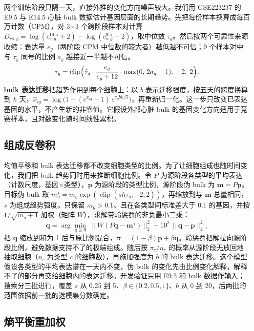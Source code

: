 \documentclass[UTF8,zihao=-4,fontset=none,a4paper]{ctexart}
\begin{document}
两个训练阶段只隔一天，直接外推的变化方向噪声较大。我们用 GSE223237 的 E9.5 与 E14.5 心脏 bulk 数据估计基因层面的长期趋势。先把每份样本换算成每百万计数（CPM），对 3$\times$3 个跨阶段样本对计算 $D_{rs,g}=\log(c^{14.5}_{r,g}+2)-\log(c^{9.5}_{s,g}+2)$，取中位数 $\tilde\tau_g$。然后按两个可靠性来源收缩：表达量 $e_g$（两阶段 CPM 中位数的较大者）越低越不可信；9 个样本对中与 $\tilde\tau_g$ 同号的比例 $a_g$ 越接近一半越不可信。
\begin{equation}
\tau_g=\operatorname{clip}\Bigl(\tilde\tau_g\cdot\frac{e_g}{e_g+12}\cdot\max(0,\,2a_g-1),\;-2,\;2\Bigr).
\end{equation}
\textbf{bulk 表达迁移}把趋势作用到每个细胞上：以 $b$ 表示迁移强度，按五天的跨度换算到 $h$ 天，$\hat x_{ig}=\log\bigl(1+(e^{x_{ig}}-1)\,e^{\tau_g bh/5}\bigr)$，再重新归一化。这一步只改变已表达基因的水平，不产生新的非零值。它假设外部心脏 bulk 的基因变化方向适用于竞赛样本，且对数变化随时间线性累积。

\subsection{组成反卷积}

均值平移和 bulk 表达迁移都不改变细胞类型的比例。为了让细胞组成也随时间变化，我们把 bulk 趋势同时用来推断细胞比例。令 $P$ 为源阶段各类型的平均表达（计数尺度，基因$\times$类型），$\bm p$ 为源阶段的类型比例，源阶段伪 bulk 为 $\bm m=P\bm p$。目标伪 bulk 取 $m^\star_g=m_g\exp(\operatorname{clip}(s h\tau_g,-2,2))$，再缩放到与 $\bm m$ 总量相同，$s$ 为组成趋势强度。只保留 $m_g>0.1$、且在各类型间标准差大于 0.1 的基因，并按 $1/\sqrt{m_g+1}$ 加权（矩阵 $W$），求解带岭惩罚的非负最小二乘\cite{nnls}：
\begin{equation}
\bm q=\arg\min_{\bm q\ge 0}\;\bigl\|W(P\bm q-\bm m^\star)\bigr\|_2^2+10^2\,\|\bm q-\bm p\|_2^2 ,
\label{eq:nnls}
\end{equation}
把 $\bm q$ 缩放到和为 1 后与原比例混合，$\bm\pi=(1-\beta)\bm p+\beta\bm q$。岭惩罚把解拉向源阶段比例，避免数据支持不了的极端组成。随后按 $\pi_c/n_c$ 的概率从源阶段无放回地抽取细胞（$n_c$ 为类型 $c$ 的细胞数），再施加强度为 $b$ 的 bulk 表达迁移。这个模型假设各类型的平均表达谱在一天内不变，伪 bulk 的变化先由比例变化解释，解释不了的部分再交给细胞内的表达迁移。开发验证只用 E9.5 和 bulk 数据作输入；搜索分三批进行，覆盖 $s$ 从 0.25 到 5、$\beta\in\{0.2,0.5,1\}$、$b$ 从 0 到 20，后两批的范围依据前一批的选模集分数确定。

\subsection{熵平衡重加权}
\end{document}

